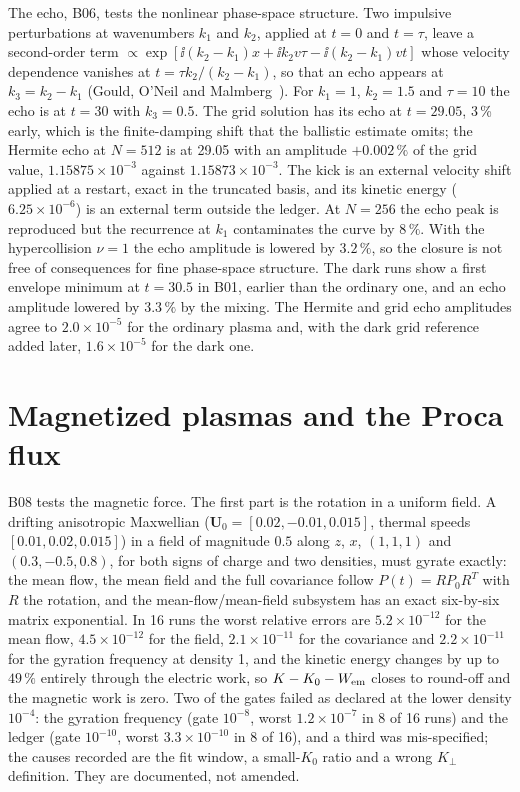 The echo, B06, tests the nonlinear phase-space structure. Two impulsive perturbations at wavenumbers $k_1$ and $k_2$, applied at $t=0$ and $t=\tau$, leave a second-order term $\propto\exp[\ii(k_2-k_1)x+\ii k_2v\tau-\ii(k_2-k_1)vt]$ whose velocity dependence vanishes at $t=\tau k_2/(k_2-k_1)$, so that an echo appears at $k_3=k_2-k_1$ (Gould, O'Neil and Malmberg~\cite{Gould1967}). For $k_1=1$, $k_2=1.5$ and $\tau=10$ the echo is at $t=30$ with $k_3=0.5$. The grid solution has its echo at $t=29.05$, 3\,\% early, which is the finite-damping shift that the ballistic estimate omits; the Hermite echo at $N=512$ is at 29.05 with an amplitude $+0.002\,\%$ of the grid value, $1.15875\times10^{-3}$ against $1.15873\times10^{-3}$. The kick is an external velocity shift applied at a restart, exact in the truncated basis, and its kinetic energy ($6.25\times10^{-6}$) is an external term outside the ledger. At $N=256$ the echo peak is reproduced but the recurrence at $k_1$ contaminates the curve by $8\,\%$. With the hypercollision $\nu=1$ the echo amplitude is lowered by $3.2\,\%$, so the closure is not free of consequences for fine phase-space structure. The dark runs show a first envelope minimum at $t=30.5$ in B01, earlier than the ordinary one, and an echo amplitude lowered by $3.3\,\%$ by the mixing. The Hermite and grid echo amplitudes agree to $2.0\times10^{-5}$ for the ordinary plasma and, with the dark grid reference added later, $1.6\times10^{-5}$ for the dark one.

\section{Magnetized plasmas and the Proca flux}\label{sec:magnetized}

B08 tests the magnetic force. The first part is the rotation in a uniform field. A drifting anisotropic Maxwellian ($\mathbf U_0=[0.02,-0.01,0.015]$, thermal speeds $[0.01,0.02,0.015]$) in a field of magnitude $0.5$ along $z$, $x$, $(1,1,1)$ and $(0.3,-0.5,0.8)$, for both signs of charge and two densities, must gyrate exactly: the mean flow, the mean field and the full covariance follow $P(t)=RP_0R^T$ with $R$ the rotation, and the mean-flow/mean-field subsystem has an exact six-by-six matrix exponential. In 16 runs the worst relative errors are $5.2\times10^{-12}$ for the mean flow, $4.5\times10^{-12}$ for the field, $2.1\times10^{-11}$ for the covariance and $2.2\times10^{-11}$ for the gyration frequency at density 1, and the kinetic energy changes by up to $49\,\%$ entirely through the electric work, so $K-K_0-W_{\rm em}$ closes to round-off and the magnetic work is zero. Two of the gates failed as declared at the lower density $10^{-4}$: the gyration frequency (gate $10^{-8}$, worst $1.2\times10^{-7}$ in 8 of 16 runs) and the ledger (gate $10^{-10}$, worst $3.3\times10^{-10}$ in 8 of 16), and a third was mis-specified; the causes recorded are the fit window, a small-$K_0$ ratio and a wrong $K_\perp$ definition. They are documented, not amended.

